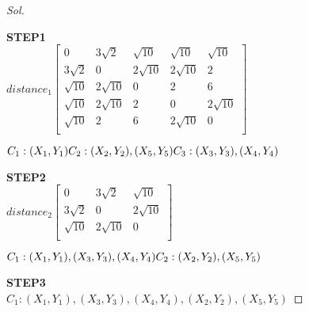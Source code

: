 \documentclass[11pt, oneside]{article}   	%
\newenvironment{Solution}[1][Sol]{%
  \begin{proof}[#1]$ $\par\nobreak\ignorespaces
	\qquad
}{%
  \end{proof}
}
\begin{document}
\begin{enumerate}[resume*]
\begin{Solution}
\textbf{STEP1}\\
		$distance_{1}\left[\begin{array}{ccccc}
		0 & 3\sqrt{2} & \sqrt{10} & \sqrt{10} & \sqrt{10}\\
		3\sqrt{2} & 0 & 2\sqrt{10} & 2\sqrt{10} & 2\\
		\sqrt{10} & 2\sqrt{10} & 0 & 2 & 6 \\
		\sqrt{10}  & 2\sqrt{10} & 2 & 0 & 2\sqrt{10}\\
		\sqrt{10} & 2 & 6 & 2\sqrt{10} & 0\\
		\end{array}\right]$
		
		$ C_1:(X_1,Y_1)\\C_2:(X_2,Y_2),(X_5,Y_5)\\C_3:(X_3,Y_3), (X_4,Y_4)$
	
\textbf{STEP2}\\
		$distance_{2}\left[\begin{array}{ccccc}
		0 & 3\sqrt{2} & \sqrt{10}\\
		3\sqrt{2} & 0 & 2\sqrt{10}\\
		\sqrt{10} & 2\sqrt{10} & 0\\
		\end{array}\right]$
		
		$ C_1:(X_1,Y_1),(X_3,Y_3),(X_4,Y_4)\\C_2:(X_2,Y_2),(X_5,Y_5)$
		
\textbf{STEP3}\\
		$ C_1:(X_1,Y_1),(X_3,Y_3), (X_4,Y_4),(X_2,Y_2),(X_5,Y_5)$	
		
		
		
	\end{Solution}
\end{enumerate}
\end{document}
